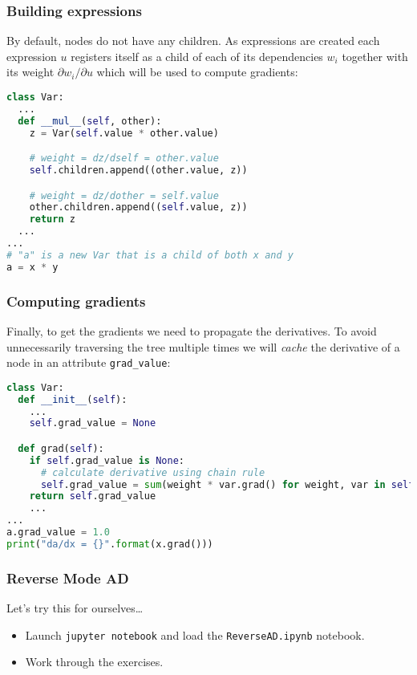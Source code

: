 \documentclass{beamer}
\begin{document}
\begin{frame}[fragile]
	\frametitle{Building expressions}

By default, nodes do not have any children. As expressions are created each expression $u$ registers itself as a child of each of its dependencies $w_i$ together with its weight $\partial w_i/\partial u$ which will be used to compute gradients:

\begin{lstlisting}[language=python]
class Var:
  ...
  def __mul__(self, other):
    z = Var(self.value * other.value)

    # weight = dz/dself = other.value
    self.children.append((other.value, z))

    # weight = dz/dother = self.value
    other.children.append((self.value, z))
    return z
  ...
...
# "a" is a new Var that is a child of both x and y
a = x * y
\end{lstlisting}
\end{frame}

\begin{frame}[fragile]
\frametitle{Computing gradients}

Finally, to get the gradients we need to propagate the derivatives. To avoid unnecessarily traversing the tree multiple times we will \emph{cache} the derivative of a node in an attribute \lstinline!grad_value!:
\begin{lstlisting}[language=python,basicstyle=\footnotesize\ttfamily]
class Var:
  def __init__(self):
    ...
    self.grad_value = None

  def grad(self):
    if self.grad_value is None:
      # calculate derivative using chain rule
      self.grad_value = sum(weight * var.grad() for weight, var in self.children)
    return self.grad_value
	...
...
a.grad_value = 1.0
print("da/dx = {}".format(x.grad()))
\end{lstlisting}
\end{frame}

\begin{frame}
\frametitle{Reverse Mode AD}

\begin{block}{Let's try this for ourselves\ldots}
\begin{itemize}
	\item Launch \lstinline!jupyter notebook! and load the \lstinline!ReverseAD.ipynb! notebook.
	\item Work through the exercises.
\end{itemize}
\end{block}
\end{frame}
\end{document}
